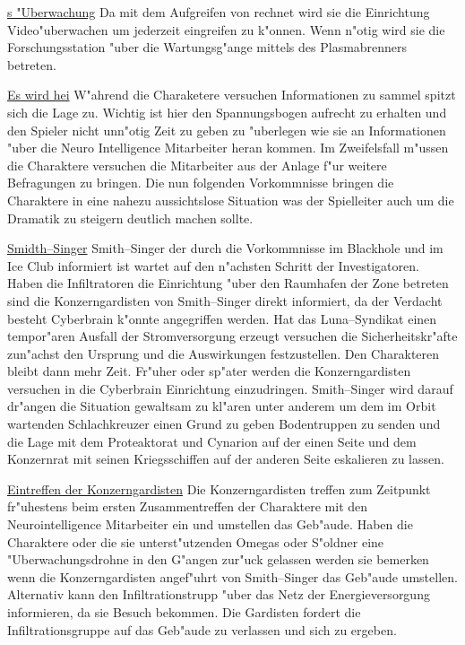 \underline{\xl{}s "Uberwachung}  Da \xl{} mit dem Aufgreifen von \ml{} rechnet wird sie die Einrichtung Video"uberwachen um jederzeit eingreifen zu k"onnen. Wenn n"otig wird sie die Forschungsstation "uber die Wartungsg"ange mittels des Plasmabrenners betreten.

\underline{Es wird hei\3} W"ahrend die Charaketere versuchen Informationen zu sammel spitzt sich die Lage zu. Wichtig ist hier den Spannungsbogen aufrecht zu erhalten und den Spieler nicht unn"otig Zeit zu geben zu "uberlegen wie sie an Informationen "uber die Neuro Intelligence Mitarbeiter heran kommen. Im Zweifelsfall m"ussen die Charaktere versuchen die Mitarbeiter aus der Anlage f"ur weitere Befragungen zu bringen. Die nun folgenden Vorkommnisse bringen die Charaktere in eine nahezu aussichtslose Situation was der Spielleiter auch um die Dramatik zu steigern deutlich machen sollte.

\underline{Smidth--Singer} Smith--Singer der durch die Vorkommnisse im Blackhole und im Ice Club informiert ist wartet auf den n"achsten Schritt der Investigatoren. Haben die Infiltratoren die Einrichtung "uber den Raumhafen der Zone betreten sind die Konzerngardisten von Smith--Singer direkt informiert, da\3 der Verdacht besteht Cyberbrain k"onnte angegriffen werden. Hat das Luna--Syndikat einen tempor"aren Ausfall der Stromversorgung erzeugt versuchen die Sicherheitskr"afte zun"achst den Ursprung und die Auswirkungen festzustellen. Den Charakteren bleibt dann mehr Zeit. Fr"uher oder sp"ater werden die Konzerngardisten versuchen in die Cyberbrain Einrichtung einzudringen. Smith--Singer wird darauf dr"angen die Situation gewaltsam zu kl"aren unter anderem um dem im Orbit wartenden Schlachkreuzer einen Grund zu geben Bodentruppen zu senden und die Lage mit dem Proteaktorat und Cynarion auf der einen Seite und dem Konzernrat mit seinen Kriegsschiffen auf der anderen Seite eskalieren zu lassen. 

\underline{Eintreffen der Konzerngardisten} Die Konzerngardisten treffen zum Zeitpunkt fr"uhestens beim ersten Zusammentreffen der Charaktere mit den Neurointelligence Mitarbeiter ein und umstellen das Geb"aude. Haben die Charaktere oder die sie unterst"utzenden Omegas oder S"oldner eine "Uberwachungsdrohne in den G"angen zur"uck gelassen werden sie bemerken wenn die Konzerngardisten angef"uhrt von Smith--Singer das Geb"aude umstellen. Alternativ kann \xl{} den Infiltrationstrupp "uber das Netz der Energieversorgung informieren, da\3 sie Besuch bekommen. Die Gardisten fordert die Infiltrationsgruppe auf das Geb"aude zu verlassen und sich zu ergeben. 

